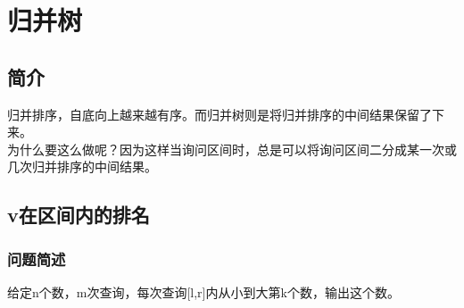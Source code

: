 \section{归并树}
\subsection{简介}
    归并排序，自底向上越来越有序。而归并树则是将归并排序的中间结果保留了下来。\\
    为什么要这么做呢？因为这样当询问区间时，总是可以将询问区间二分成某一次或几次归并排序的中间结果。
\subsection{v在区间内的排名}
    \subsubsection{问题简述}
        给定n个数，m次查询，每次查询[l,r]内从小到大第k个数，输出这个数。
